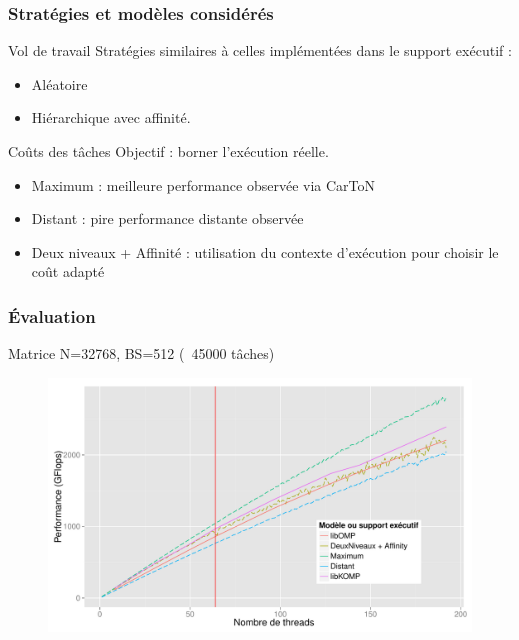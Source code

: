 \documentclass[xcolor={usenames,dvipsnames,svgnames,table}, aspectratio=43]{beamer}
\begin{document}
\begin{frame}
  \frametitle{Stratégies et modèles considérés}

  \begin{block}{Vol de travail}
    Stratégies similaires à celles implémentées dans le support exécutif :
    \begin{itemize}
      \item Aléatoire
      \item Hiérarchique avec affinité.
    \end{itemize}
  \end{block}

  \begin{block}{Coûts des tâches}
    Objectif : borner l'exécution réelle.
    \begin{itemize}
      \item Maximum : meilleure performance observée via CarToN
      \item Distant : pire performance distante observée
      \item Deux niveaux + Affinité : utilisation du contexte d'exécution pour choisir le coût adapté
    \end{itemize}
  \end{block}

\end{frame}


\begin{frame}
  \frametitle{Évaluation}
  Matrice N=32768, BS=512 (~45000 tâches)
  \begin{figure}
    \includegraphics[width=\textwidth]{graph/simu_affinity_runtime_idchire.pdf}%
  \end{figure}


\end{frame}
\end{document}
